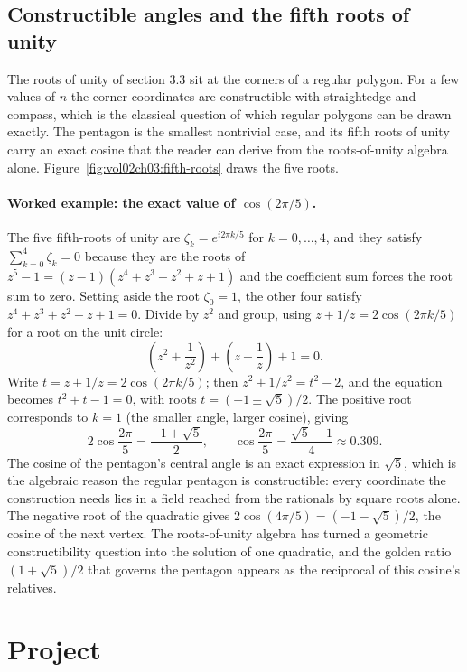 \subsection{Constructible angles and the fifth roots of unity}

The roots of unity of section 3.3 sit at the corners of a regular polygon.
For a few values of $n$ the corner coordinates are constructible with
straightedge and compass, which is the classical question of which regular
polygons can be drawn exactly. The pentagon is the smallest nontrivial case,
and its fifth roots of unity carry an exact cosine that the reader can derive
from the roots-of-unity algebra alone.
Figure~\ref{fig:vol02ch03:fifth-roots} draws the five roots.

\paragraph{Worked example: the exact value of $\cos(2\pi/5)$.} The five
fifth-roots of unity are $\zeta_{k} = e^{i 2\pi k/5}$ for $k = 0,\dots,4$, and
they satisfy $\sum_{k=0}^{4}\zeta_{k} = 0$ because they are the roots of
$z^{5} - 1 = (z - 1)(z^{4} + z^{3} + z^{2} + z + 1)$ and the coefficient sum
forces the root sum to zero. Setting aside the root $\zeta_{0} = 1$, the other
four satisfy $z^{4} + z^{3} + z^{2} + z + 1 = 0$. Divide by $z^{2}$ and group,
using $z + 1/z = 2\cos(2\pi k/5)$ for a root on the unit circle:
\[
\left(z^{2} + \frac{1}{z^{2}}\right) + \left(z + \frac{1}{z}\right) + 1 = 0.
\]
Write $t = z + 1/z = 2\cos(2\pi k/5)$; then $z^{2} + 1/z^{2} = t^{2} - 2$, and
the equation becomes $t^{2} + t - 1 = 0$, with roots $t = (-1 \pm
\sqrt{5})/2$. The positive root corresponds to $k = 1$ (the smaller angle,
larger cosine), giving
\[
2\cos\frac{2\pi}{5} = \frac{-1 + \sqrt{5}}{2},
\qquad
\cos\frac{2\pi}{5} = \frac{\sqrt{5} - 1}{4} \approx 0.309.
\]
The cosine of the pentagon's central angle is an exact expression in
$\sqrt{5}$, which is the algebraic reason the regular pentagon is
constructible: every coordinate the construction needs lies in a field
reached from the rationals by square roots alone. The negative root of the
quadratic gives $2\cos(4\pi/5) = (-1 - \sqrt{5})/2$, the cosine of the next
vertex. The roots-of-unity algebra has turned a geometric constructibility
question into the solution of one quadratic, and the golden ratio
$(1 + \sqrt{5})/2$ that governs the pentagon appears as the reciprocal of
this cosine's relatives.

\section{Project}

